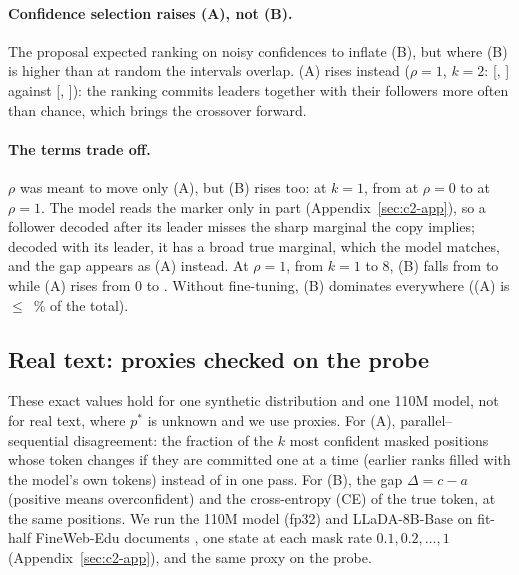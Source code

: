 \paragraph{Confidence selection raises (A), not (B).}
The proposal expected ranking on noisy confidences to inflate (B), but where (B) is higher
than at random the intervals overlap. (A) rises instead ($\rho=1$, $k=2$:
\CTwoConfAatRhoOneKTwo{} [\CTwoConfAatRhoOneKTwoLo, \CTwoConfAatRhoOneKTwoHi] against
\CTwoRandAatRhoOneKTwo{} [\CTwoRandAatRhoOneKTwoLo, \CTwoRandAatRhoOneKTwoHi]): the ranking
commits leaders together with their followers more often than chance, which brings the
crossover forward.

\paragraph{The terms trade off.}
$\rho$ was meant to move only (A), but (B) rises too: at $k=1$, from \CTwoConfBatRhoZeroKOne{}
at $\rho=0$ to \CTwoConfBatRhoOneKOne{} at $\rho=1$. The model reads the marker only in part
(Appendix~\ref{sec:c2-app}), so a follower decoded after its leader misses the sharp marginal
the copy implies; decoded with its leader, it has a broad true marginal, which the model
matches, and the gap appears as (A) instead. At $\rho=1$, from $k=1$ to $8$, (B) falls from
\CTwoConfBatRhoOneKOne{} to \CTwoConfBatRhoOneKEight{} while (A) rises from $0$ to
\CTwoConfAatRhoOneKEight. Without fine-tuning, (B) dominates everywhere ((A) is ${\le}\,$%
\CTwoUntunedConfShareAMax\% of the total).

\subsection{Real text: proxies checked on the probe}
\label{sec:c2-text}

These exact values hold for one synthetic distribution and one 110M model, not for real text,
where $p^*$ is unknown and we use proxies. For (A), parallel--sequential disagreement: the
fraction of the $k$ most confident masked positions whose token changes if they are
committed one at a time (earlier ranks filled with the model's own tokens) instead of in one
pass. For (B), the gap $\Delta=c-a$ (positive means overconfident) and the
cross-entropy (CE) of the true token, at the same positions.
We run the 110M model (fp32) and LLaDA-8B-Base \citep[fp16;][]{nie2025llada} on
\CTwoTTenNDocs{} fit-half FineWeb-Edu documents \citep{penedo2024fineweb}, one state at each
mask rate $0.1, 0.2, \dots, 1$ (Appendix~\ref{sec:c2-app}), and the same proxy on the probe.

